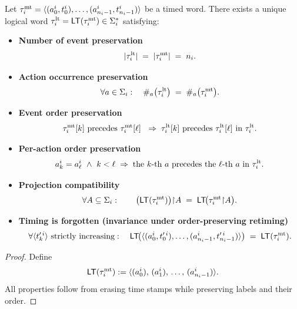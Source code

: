 \documentclass{article}
\begin{document}
  \begin{lemma}
  Let \(\tau^{\mathrm{mt}}_i=\langle (a^i_0,t^i_0),\dots,(a^i_{n_i-1},t^i_{n_i-1}) \rangle  \) be a timed word.
  There exists a unique logical word \(\tau^{\mathrm{lt}}_i=\mathsf{LT}(\tau^{\mathrm{mt}}_i)\in\Sigma_i^{*}\) satisfying:
  \begin{itemize}
    \item \textbf{Number of event preservation}\\[2pt]
    \[
    |\tau^{\mathrm{lt}}_i| \;=\; |\tau^{\mathrm{mt}}_i| \;=\; n_i.
    \]
    \item \textbf{Action occurrence preservation}\\[2pt]
    \[
    \forall a\in\Sigma_i:\quad \#_{a}\big(\tau^{\mathrm{lt}}_i\big) \;=\; \#_{a}\big(\tau^{\mathrm{mt}}_i\big).
    \]
    \item \textbf{Event order preservation}\\[2pt]
    \[
    \taumt_i[k]\ \text{precedes}\ \taumt_i[\ell]\ \;\Rightarrow\; \tault_i[k]\ \text{precedes}\ \tault_i[\ell]\ \text{in } \tault_i.
    \]
    \item \textbf{Per-action order preservation}\\[2pt]
    \[
    a^i_k=a^i_\ell\ \wedge\ k<\ell \;\Rightarrow\; 
    \text{the \(k\)-th \(a\) precedes the \(\ell\)-th \(a\) in }\tau^{\mathrm{lt}}_i.
    \]
    \item \textbf{Projection compatibility}\\[2pt]
    \[
    \forall A\subseteq\Sigma_i:\qquad 
    \big(\mathsf{LT}(\tau^{\mathrm{mt}}_i)\big){\upharpoonright}A \;=\; \mathsf{LT}\!\big(\tau^{\mathrm{mt}}_i{\upharpoonright}A\big).
    \]
    \item \textbf{Timing is forgotten (invariance under order-preserving retiming)}\\[2pt]
    \[
    \forall \langle t'^{\,i}_k\rangle\text{ strictly increasing}:\quad
    \mathsf{LT}\!\big(\langle (a^i_0,t'^{\,i}_0),\dots,(a^i_{n_i-1},t'^{\,i}_{n_i-1}) \rangle \big) \;=\; \mathsf{LT}(\tau^{\mathrm{mt}}_i).
    \]
  \end{itemize}
  \end{lemma}
  
  \begin{proof}
  \;
  Define
  \[
  \mathsf{LT}(\tau^{\mathrm{mt}}_i):=\langle (a^i_0),\,(a^i_1),\,\dots,\,(a^i_{n_i-1}) \rangle .
  \]
  All properties follow from erasing time stamps while preserving labels and their order.
  \end{proof}
  
\end{document}
